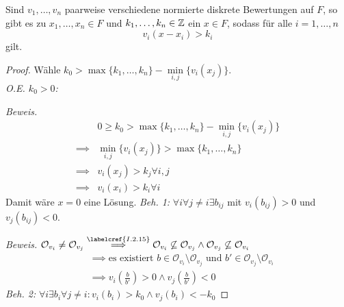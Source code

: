 \begin{theorem}
    Sind $v_1,\ldots,v_n$ paarweise verschiedene normierte diskrete Bewertungen auf $F$, so gibt es zu 
    $x_1,\ldots,x_n \in F$ und $k_1, \ldots,k_n \in \mathbb{Z}$ ein $x \in F$, sodass für alle $i = 1, \ldots,n$
    $$ v_i(x - x_i) > k_i$$
    gilt.  
\end{theorem}
\begin{proof}
    Wähle $k_0 > \max\{k_1, \ldots, k_n\} - \min\limits_{i,j}\{v_i(x_j)\}$.\\
    \emph{O.E. $k_0 > 0$:}

    \emph{Beweis.}
    \begin{align*}
        & 0 \geq k_0 > \max\{k_1, \ldots, k_n\} - \min_{i,j} \{v_i(x_j)\}\\
        \implies & \min_{i,j} \{v_i(x_j)\} > \max\{k_1, \ldots, k_n\}\\
        \implies & v_i(x_j) > k_j \forall i,j\\
        \implies & v_i(x_i) > k_i \forall i
    \end{align*}
    Damit wäre $x=0$ eine Lösung.\nl
    \emph{Beh. 1:} $\forall i \forall j\ne i \exists b_{ij}$ mit $v_i(b_{ij}) > 0$ und $v_j(b_{ij}) < 0$.

    \emph{Beweis.} $\mathcal{O}_{v_i} \ne \mathcal{O}_{v_j} \stackrel{\labelcref{I.2.15}}{\implies} \mathcal{O}_{v_i} \not \subseteq \mathcal{O}_{v_j}
    \land \mathcal{O}_{v_j} \not \subseteq \mathcal{O}_{v_i}$ 
    \begin{align*}
        & \implies \text{es existiert } b \in \mathcal{O}_{v_i} \setminus \mathcal{O}_{v_j} \text{ und } b' \in \mathcal{O}_{v_j} \setminus \mathcal{O}_{v_i}\\
        & \implies v_i(\frac{b}{b'}) > 0 \land v_j(\frac{b}{b'}) < 0
    \end{align*}
    \emph{Beh. 2:} $\forall i \exists b_i \forall j \ne i: v_i(b_i) > k_0 \land v_j(b_i) < -k_0$


\end{proof}
